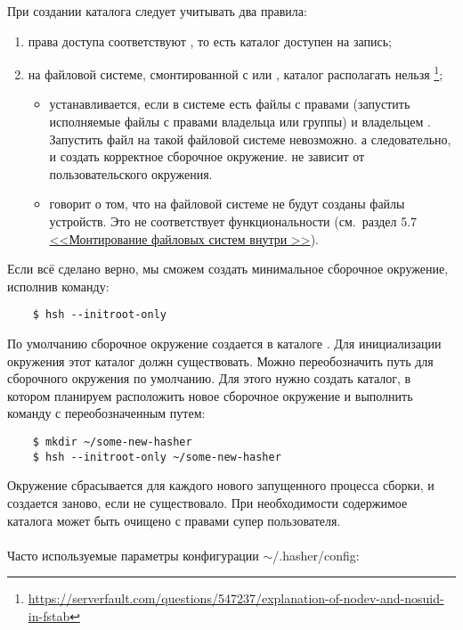 \begin{itemize}
	При создании каталога  следует учитывать два правила:
	\begin{enumerate}
		\item права доступа соответствуют , то есть каталог доступен на запись;
		\item на файловой системе, смонтированной с  или , каталог располагать нельзя%
		\footnote{\href{https://serverfault.com/questions/547237/explanation-of-nodev-and-nosuid-in-fstab}{https://serverfault.com/questions/547237/explanation-of-nodev-and-nosuid-in-fstab}};
		\begin{itemize}
			\item {} устанавливается, если в системе есть файлы с правами 
			(запустить исполняемые файлы с правами владельца или группы) и владельцем .
			Запустить файл  на такой файловой системе невозможно. а следовательно,
			и создать корректное сборочное окружение.  не зависит от пользовательского окружения.
			\item {} говорит о том, что на файловой системе не будут созданы файлы устройств.
			Это не соответствует функциональности  (см.~раздел 5.7
			\hyperlink{mount_fs_hasher}{<<Монтирование файловых систем внутри >>}).
		\end{itemize}
	\end{enumerate}
\end{itemize}
Если всё сделано верно, мы сможем создать минимальное сборочное окружение, исполнив команду:
\begin{verbatim}
	$ hsh --initroot-only
\end{verbatim}
По умолчанию сборочное окружение создается в каталоге . Для инициализации окружения
этот каталог должн существовать. Можно переобозначить путь для сборочного окружения по умолчанию.
Для этого нужно создать каталог, в котором планируем расположить новое сборочное окружение и выполнить
команду с переобозначенным путем:
\begin{verbatim}
	$ mkdir ~/some-new-hasher
	$ hsh --initroot-only ~/some-new-hasher
\end{verbatim}
Окружение сбрасывается для каждого нового запущенного процесса сборки, и создается заново, если
не существовало. При необходимости содержимое каталога может быть очищено с правами
супер пользователя.\\
\\
Часто используемые параметры конфигурации $\sim$/.hasher/config:
